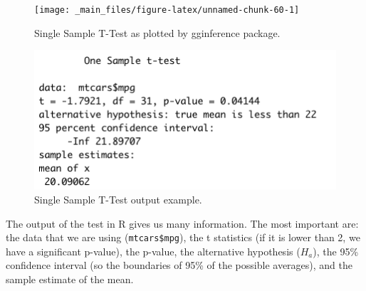 \documentclass[
]{article}
\newenvironment{Shaded}{\begin{snugshade}}{\end{snugshade}}
\newcommand{\AttributeTok}[1]{\textcolor[rgb]{0.13,0.29,0.53}{#1}}
\newcommand{\CommentTok}[1]{\textcolor[rgb]{0.56,0.35,0.01}{\textit{#1}}}
\newcommand{\DecValTok}[1]{\textcolor[rgb]{0.00,0.00,0.81}{#1}}
\newcommand{\FunctionTok}[1]{\textcolor[rgb]{0.13,0.29,0.53}{\textbf{#1}}}
\newcommand{\NormalTok}[1]{#1}
\newcommand{\SpecialCharTok}[1]{\textcolor[rgb]{0.81,0.36,0.00}{\textbf{#1}}}
\newcommand{\StringTok}[1]{\textcolor[rgb]{0.31,0.60,0.02}{#1}}
\begin{document}
\begin{Shaded}
\end{Shaded}

\begin{figure}[H]

{\centering \texttt{[image: \_main\_files/figure-latex/unnamed-chunk-60-1]} 

}

\caption{Single Sample T-Test as plotted by gginference package.}\label{fig:unnamed-chunk-60}
\end{figure}

\begin{figure}[H]

{\centering \includegraphics[width=0.5\linewidth,]{images/Schermata 2022-03-29 alle 16.14.37} 

}

\caption{Single Sample T-Test output example.}\label{fig:unnamed-chunk-61}
\end{figure}

The output of the test in R gives us many information. The most
important are: the data that we are using (\texttt{mtcars\$mpg}), the t
statistics (if it is lower than 2, we have a significant p-value), the
p-value, the alternative hypothesis (\(H_a\)), the 95\% confidence interval
(so the boundaries of 95\% of the possible averages), and the sample
estimate of the mean.
\end{document}

